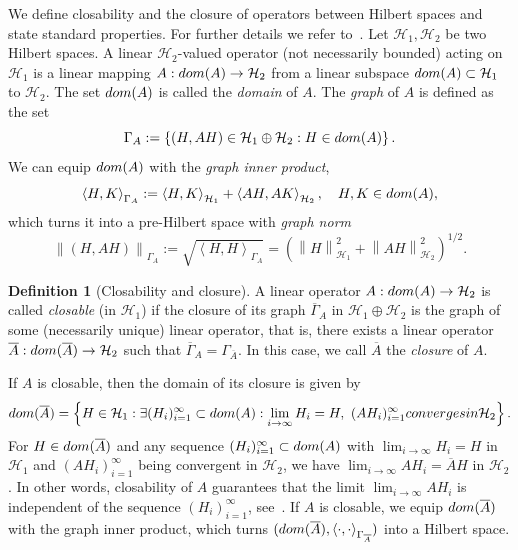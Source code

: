 \documentclass[namedate,webpdf]{ima-authoring-template-blank}
\newcommand*{\nm}[1]{{\left\|#1\right \|}}
\newcommand*{\ip}[2]{\left\langle #1, #2 \right\rangle}
\newcounter{counter}
\numberwithin{counter}{section}
\numberwithin{equation}{section}
\theoremstyle{plain}
\theoremstyle{definition}
\newtheorem{definition}[counter]{Definition}
\newcommand*{\cH}{\mathcal{H}}
\theoremstyle{thmstyletwo}
\begin{document}
We define closability and the closure of operators between Hilbert spaces and state standard properties. For further details we refer to~\citet[Ch. 12]{berezanskij_FunctionalAnalysisVol2_1996}.
Let \(\cH_1, \cH_2\) be two Hilbert spaces. A linear \(\cH_2\)-valued operator (not necessarily bounded) acting on \(\cH_1\) is a linear mapping \(A: \textup{dom}(A) \to \cH_2\) from a linear subspace \(\textup{dom}(A) \subset \cH_1\) to \(\cH_2\). The set \(\textup{dom}(A)\) is called the \emph{domain} of \(A\). 
The \emph{graph} of \(A\) is defined as the set
\[
\Gamma_A := \left\{(H, AH) \in \cH_1 \oplus \cH_2: H \in \textup{dom}(A)\right\}.
\]
We can equip \( \textup{dom(A)} \) with the \emph{graph inner product},
\[
\ip{H}{K}_{\Gamma_A} := \ip{H}{K}_{\cH_1} + \ip{AH}{AK}_{\cH_2}, \quad H,K\in \textup{dom}(A),
\]
which turns it into a pre-Hilbert space with \emph{graph norm}
\[
\nm{(H, AH)}_{\Gamma_A} 
:= \sqrt{\ip{H}{H}_{\Gamma_A}}
= \left(\nm{H}_{\cH_1}^2 + \nm{AH}_{\cH_2}^2\right)^{1/2}.
\]

\begin{definition}[Closability and closure]
    A linear operator \(A: \textup{dom}(A) \to \cH_2\) is called \emph{closable} (in \(\cH_1\)) if the closure of its graph \(\overline{\Gamma}_A\) in \(\cH_1 \oplus \cH_2\) is the graph of some (necessarily unique) linear operator, that is, there exists a linear operator \(\overline{A} : \textup{dom}(\overline{A}) \to \cH_2\) such that \(\overline{\Gamma}_A = \Gamma_{\overline{A}}\). In this case, we call \(\overline{A}\) the \emph{closure} of \(A\).
\end{definition}

If \(A\) is closable, then the domain of its closure is given by 
\[
\textup{dom}(\overline{A}) = \left\{H \in \cH_1: \exists (H_i)_{i = 1}^{\infty} \subset \textup{dom}(A):
\lim_{i \to \infty} H_i = H, 
\ (A H_i)_{i = 1}^{\infty} \textup{ converges in } \cH_2\right\}.
\]
For \( H \in \textup{dom}(\overline{A}) \) and any sequence \( (H_i)_{i = 1}^{\infty} \subset \textup{dom}(A) \) with \( \lim_{i \to \infty} H_i = H \) in \( \cH_1 \) and \( (A H_i)_{i = 1}^{\infty} \) being convergent in \( \cH_2 \), we have \( \lim_{i \to \infty} A H_i = \overline{A} H\) in \( \cH_2 \). In other words, closability of \( A \) guarantees that the limit \( \lim_{i \to \infty} A H_i \) is independent of the sequence \( (H_i)_{i = 1}^{\infty} \), see~\citet[Thm. 2.1]{berezanskij_FunctionalAnalysisVol2_1996}.
If \(A\) is closable, we equip \(\textup{dom}(\overline{A})\) with the graph inner product, which turns \((\textup{dom}(\overline{A}), \ip{\cdot}{\cdot}_{\Gamma_{\overline{A}}})\) into a Hilbert space.
\end{document}
